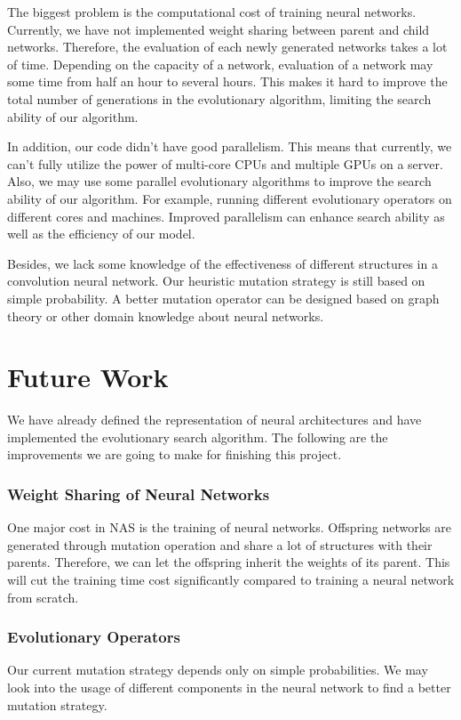 \documentclass[conference]{IEEEtran}
\begin{document}
The biggest problem is the computational cost of training neural networks. Currently, we have not implemented weight sharing between parent and child networks. Therefore, the evaluation of each newly generated networks takes a lot of time. Depending on the capacity of a network, evaluation of a network may some time from half an hour to several hours. This makes it hard to improve the total number of generations in the evolutionary algorithm, limiting the search ability of our algorithm.

In addition, our code didn't have good parallelism. This means that currently, we can't fully utilize the power of multi-core CPUs and multiple GPUs on a server. Also, we may use some parallel evolutionary algorithms to improve the search ability of our algorithm. For example, running different evolutionary operators on different cores and machines. Improved parallelism can enhance search ability as well as the efficiency of our model.

Besides, we lack some knowledge of the effectiveness of different structures in a convolution neural network. Our heuristic mutation strategy is still based on simple probability. A better mutation operator can be designed based on graph theory or other domain knowledge about neural networks.



\section{Future Work}  

We have already defined the representation of neural architectures and have implemented the evolutionary search algorithm. The following are the improvements we are going to make for finishing this project.


\subsubsection{Weight Sharing of Neural Networks}    
One major cost in NAS is the training of neural networks. Offspring networks are generated through mutation operation and share a lot of structures with their parents. Therefore, we can let the offspring inherit the weights of its parent. This will cut the training time cost significantly compared to training a neural network from scratch.

\subsubsection{Evolutionary Operators}
Our current mutation strategy depends only on simple probabilities. We may look into the usage of different components in the neural network to find a better mutation strategy.
\end{document}
